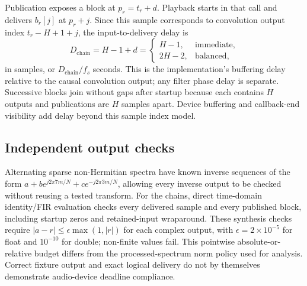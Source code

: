 Publication exposes a block at $p_r=t_r+d$. Playback starts in that call and
delivers $b_r[j]$ at $p_r+j$. Since this sample corresponds to convolution
output index $t_r-H+1+j$, the input-to-delivery delay is
\begin{equation}
 D_{\mathrm{chain}}=H-1+d
 =\begin{cases}
 H-1,&\text{immediate},\\
 2H-2,&\text{balanced},
 \end{cases}
 \label{eq:chain-delay}
\end{equation}
in samples, or $D_{\mathrm{chain}}/f_s$ seconds. This is the implementation's
buffering delay relative to the causal convolution output; any filter phase
delay is separate. Successive blocks join without gaps after startup because
each contains $H$ outputs and publications are $H$ samples apart.
Device buffering and callback-end visibility add delay beyond this sample
index model.

\subsection{Independent output checks}
Alternating sparse non-Hermitian spectra have known inverse sequences of the
form $a+b e^{j2\pi 7m/N}+c e^{-j2\pi 3m/N}$, allowing every inverse output
to be checked without reusing a tested transform. For the chains, direct
time-domain identity/FIR evaluation checks every delivered sample and every
published block, including startup zeros and retained-input wraparound.
These synthesis checks require
$|a-r|\le\epsilon\max(1,|r|)$ for each complex output, with
$\epsilon=2\times10^{-5}$ for float and $10^{-10}$ for double; non-finite
values fail. This pointwise absolute-or-relative budget differs from the
processed-spectrum norm policy used for analysis. Correct fixture output and
exact logical delivery do not by themselves demonstrate audio-device
deadline compliance.
